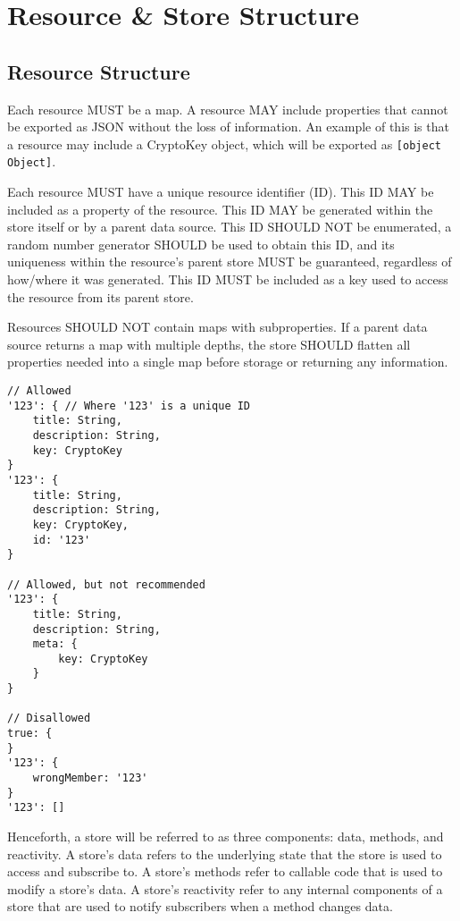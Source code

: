 \documentclass{article}
\begin{document}
\section{Resource \& Store Structure}

\subsection{Resource Structure}
Each resource MUST be a map. A resource MAY include properties that cannot be exported as JSON without the loss of information. An example of this is that a resource may include a CryptoKey object, which will be exported as \verb|[object Object]|.

Each resource MUST have a unique resource identifier (ID). This ID MAY be included as a property of the resource. This ID MAY be generated within the store itself or by a parent data source. This ID SHOULD NOT be enumerated, a random number generator SHOULD be used to obtain this ID, and its uniqueness within the resource's parent store MUST be guaranteed, regardless of how/where it was generated. This ID MUST be included as a key used to access the resource from its parent store.

Resources SHOULD NOT contain maps with subproperties. If a parent data source returns a map with multiple depths, the store SHOULD flatten all properties needed into a single map before storage or returning any information.

\begin{lstlisting}[caption=Valid Resource Structure]
// Allowed
'123': { // Where '123' is a unique ID
    title: String,
    description: String,
    key: CryptoKey
}
'123': {
    title: String,
    description: String,
    key: CryptoKey,
    id: '123'
}

// Allowed, but not recommended
'123': {
    title: String,
    description: String,
    meta: {
        key: CryptoKey
    }
}

// Disallowed
true: {
}
'123': {
    wrongMember: '123'
}
'123': []
\end{lstlisting}

Henceforth, a store will be referred to as three components: data, methods, and reactivity. A store's data refers to the underlying state that the store is used to access and subscribe to. A store's methods refer to callable code that is used to modify a store's data. A store's reactivity refer to any internal components of a store that are used to notify subscribers when a method changes data.
\end{document}
